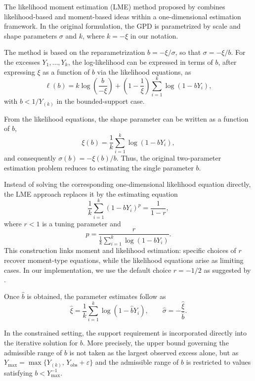 The likelihood moment estimation (LME) method proposed by \citet{zhang2007likelihood} combines likelihood-based and moment-based ideas within a one-dimensional estimation framework. In the original formulation, the GPD is parametrized by scale and shape parameters $\sigma$ and $k$, where $k = -\xi$ in our notation.

The method is based on the reparametrization $b = -\xi/\sigma$, so that $\sigma = -\xi/b$. For the excesses $Y_1,\dots,Y_k$, the log-likelihood can be expressed in terms of $b$, after expressing $\xi$ as a function of $b$ via the likelihood equations, as
\begin{equation}
\ell(b) = k \log\left(\frac{b}{-\xi}\right) + \left(1 - \frac{1}{\xi}\right)\sum_{i=1}^k \log(1 - bY_i),
\end{equation}
with $b < 1/Y_{(k)}$ in the bounded-support case.

From the likelihood equations, the shape parameter can be written as a function of $b$,
\begin{equation}
\xi(b) = \frac{1}{k}\sum_{i=1}^k \log(1 - bY_i),
\end{equation}
and consequently $\sigma(b) = -\xi(b)/b$. Thus, the original two-parameter estimation problem reduces to estimating the single parameter $b$.

Instead of solving the corresponding one-dimensional likelihood equation directly, the LME approach replaces it by the estimating equation
\begin{equation}
\frac{1}{k}\sum_{i=1}^k (1 - bY_i)^p = \frac{1}{1 - r},
\end{equation}
where $r < 1$ is a tuning parameter and
\begin{equation}
p = \frac{r}{\frac{1}{k}\sum_{i=1}^k \log(1 - bY_i)}.
\end{equation}
This construction links moment and likelihood estimation: specific choices of $r$ recover moment-type equations, while the likelihood equations arise as limiting cases. In our implementation, we use the default choice $r = -1/2$ as suggested by \citet{zhang2007likelihood}.

Once $\hat{b}$ is obtained, the parameter estimates follow as
\begin{equation}
\hat{\xi} = \frac{1}{k}\sum_{i=1}^k \log(1 - \hat{b}Y_i),
\qquad
\hat{\sigma} = -\frac{\hat{\xi}}{\hat{b}}.
\end{equation}

In the constrained setting, the support requirement is incorporated directly into the iterative solution for $b$. More precisely, the upper bound governing the admissible range of $b$ is not taken as the largest observed excess alone, but as
$Y_{\max} = \max\{Y_{(k)},\, Y_{\mathrm{obs}}+\varepsilon\}$ and the admissible range of $b$ is restricted to values satisfying $b < Y_{\max}^{-1}$.

